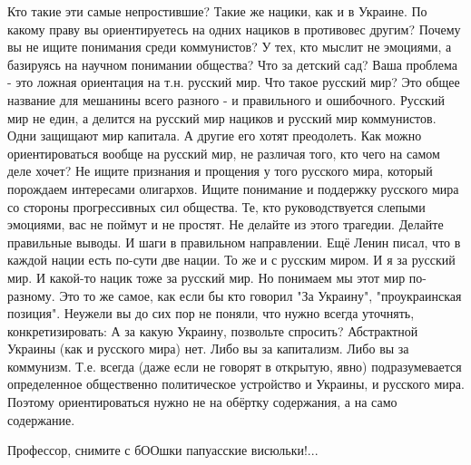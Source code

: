 \begin{itemize}
 

\obeycr
Кто такие эти самые непростившие?
Такие же нацики, как и в Украине.
По какому праву вы ориентируетесь на одних нациков в противовес другим?
Почему вы не ищите понимания среди коммунистов?
У тех, кто мыслит не эмоциями, а базируясь на научном понимании общества?
Что за детский сад?
Ваша проблема - это ложная ориентация на т.н. русский мир.
Что такое русский мир?
Это общее название для мешанины всего разного - и правильного и ошибочного.
Русский мир не един, а делится на русский мир нациков и русский мир коммунистов.
Одни защищают мир капитала.
А другие его хотят преодолеть.
Как можно ориентироваться вообще на русский мир, не различая того, кто чего на самом деле хочет?
Не ищите признания и прощения у того русского мира, который порождаем интересами олигархов.
Ищите понимание и поддержку русского мира со стороны прогрессивных сил общества.
Те, кто руководствуется слепыми эмоциями, вас не поймут и не простят.
Не делайте из этого трагедии.
Делайте правильные выводы.
И шаги в правильном направлении.
Ещё Ленин писал, что в каждой нации есть по-сути две нации.
То же и с русским миром.
И я за русский мир.
И какой-то нацик тоже за русский мир.
Но понимаем мы этот мир по-разному.
Это то же самое, как если бы кто говорил "За Украину", "проукраинская позиция".
Неужели вы до сих пор не поняли, что нужно всегда уточнять, конкретизировать:
А за какую Украину, позвольте спросить?
Абстрактной Украины (как и русского мира) нет.
Либо вы за капитализм.
Либо вы за коммунизм.
Т.е. всегда (даже если не говорят в открытую, явно) подразумевается определенное общественно политическое устройство и Украины, и русского мира.
Поэтому ориентироваться нужно не на обёртку содержания, а на само содержание.
\restorecr


 

Профессор, снимите с бООшки папуасские висюльки!...

\begin{itemize}
 

\end{itemize}
\end{itemize}
